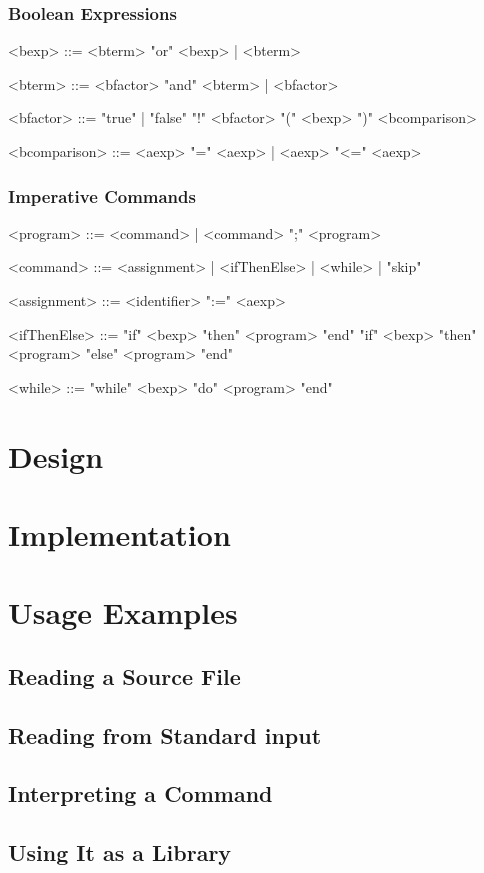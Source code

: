 \documentclass{esposito-documentation}
\begin{document}
\subsection{Boolean Expressions}
\begin{grammar}
	<bexp> ::= <bterm> "or" <bexp> | <bterm>

	<bterm> ::= <bfactor> "and" <bterm> | <bfactor>

	<bfactor> ::= "true" | "false"
	\alt "!" <bfactor>
	\alt "(" <bexp> ")"
	\alt <bcomparison>

	<bcomparison> ::= <aexp> "=" <aexp> | <aexp> "<=" <aexp>
\end{grammar}

\subsection{Imperative Commands}
\begin{grammar}
	<program> ::= <command> | <command> ";" <program>

	<command> ::= <assignment> | <ifThenElse> | <while> | "skip"

	<assignment> ::= <identifier> ":=" <aexp>

	<ifThenElse> ::= "if" <bexp> "then" <program> "end"
	\alt "if" <bexp> "then" <program> "else" <program> "end"

	<while> ::= "while" <bexp> "do" <program> "end"
\end{grammar}

\chapter{Design}

\chapter{Implementation}

\chapter{Usage Examples}

\section{Reading a Source File}

\section{Reading from Standard input}

\section{Interpreting a Command}

\section{Using It as a Library}
\end{document}
